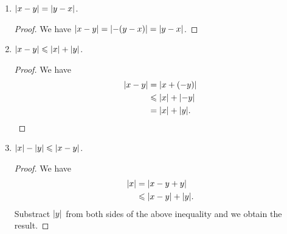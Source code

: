 \documentclass[a4paper]{article}
\begin{document}
\begin{enumerate}
\begin{enumerate}
  \item \(\lvert x-y\rvert = \lvert y-x\rvert\).

    \begin{proof}
      We have \(\lvert x-y\rvert = \lvert-(y-x)\rvert = \lvert y-x\rvert\).
    \end{proof}

  \item \(\abs{x-y} \le \abs{x} + \abs{y}\).

    \begin{proof}
      We have
      \begin{align*}
        \abs{x-y} &= \abs{x+(-y)} \\
                  &\le \abs{x} + \abs{-y} \\
                  &=\abs{x} + \abs{y}. \qedhere
      \end{align*}
    \end{proof}

  \item \(\abs{x} - \abs{y} \le \abs{x-y}\).

    \begin{proof}
      We have
      \begin{align*}
        \abs{x} &= \abs{x - y + y} \\
                &\le \abs{x-y} + \abs{y}.
      \end{align*}
      Substract \(\lvert y\rvert\) from both sides of the above inequality and we
      obtain the result.
    \end{proof}
  \end{enumerate}
\end{enumerate}
\end{document}
